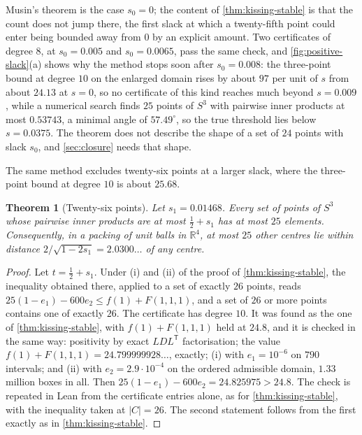 \documentclass[11pt,reqno]{amsart}
\renewcommand{\_}{\origunderscore\allowbreak}
\numberwithin{equation}{section}
\theoremstyle{plain}
\newtheorem{thm}{Theorem}[section]
\theoremstyle{definition}
\theoremstyle{remark}
\begin{document}
Musin's theorem \cite{Mus08} is the case $s_0=0$; the content of
\cref{thm:kissing-stable} is that the count does not jump there, the first
slack at which a twenty-fifth point could enter being bounded away from $0$
by an explicit amount. Two certificates of degree $8$, at $s_0=0.005$ and
$s_0=0.0065$, pass the same check, and \cref{fig:positive-slack}(a) shows why
the method stops soon after $s_0=0.008$:
the three-point bound at degree $10$ on the enlarged domain rises by about $97$
per unit of $s$ from about $24.13$ at $s=0$, so no certificate of this kind reaches much
beyond $s=0.009$, while a numerical search finds $25$ points of $S^3$ with
pairwise inner products at most $0.53743$, a minimal angle of $57.49^\circ$, so
the true threshold lies below $s=0.0375$. The theorem does not describe the
shape of a set of $24$ points with slack $s_0$, and \cref{sec:closure}
needs that shape.

The same method excludes twenty-six points at a larger slack, where the
three-point bound at degree $10$ is about $25.68$.

\begin{thm}[Twenty-six points]\label{thm:twenty-six}
Let $s_1=0.01468$. Every set of points of $S^3$ whose pairwise inner
products are at most $\tfrac12+s_1$ has at most $25$ elements.
Consequently, in a packing of unit balls in $\mathbb{R}^4$, at most $25$
other centres lie within distance $2/\sqrt{1-2s_1}=2.0300\ldots$ of any
centre.
\end{thm}

\begin{proof}
Let $t=\tfrac12+s_1$. Under (i) and (ii) of the proof of
\cref{thm:kissing-stable}, the inequality obtained there, applied to a set
of exactly $26$ points, reads $25(1-e_1)-600e_2\le f(1)+F(1,1,1)$, and a set
of $26$ or more points contains one of exactly $26$. The certificate has
degree $10$. It was found as the one of \cref{thm:kissing-stable}, with
$f(1)+F(1,1,1)$ held at $24.8$, and it is checked in the same way:
positivity by exact $LDL^{\mathsf T}$ factorisation; the value
$f(1)+F(1,1,1)=24.799999928\ldots$, exactly; (i) with $e_1=10^{-6}$ on $790$
intervals; and (ii) with $e_2=2.9\cdot10^{-4}$ on the ordered admissible
domain, $1.33$ million boxes in all. Then
$25(1-e_1)-600e_2=24.825975>24.8$. The check is repeated in Lean from the
certificate entries alone, as for \cref{thm:kissing-stable}, with the
inequality taken at $|C|=26$. The second statement follows from the
first exactly as in \cref{thm:kissing-stable}.
\end{proof}
\end{document}
